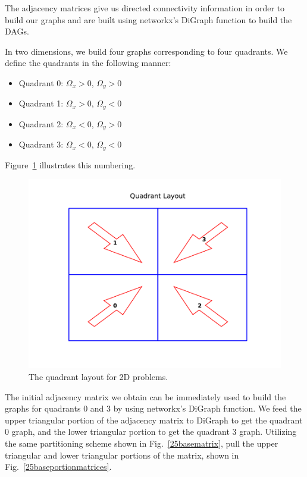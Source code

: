 \documentclass[times,final]{elsarticle}
\begin{document}
The adjacency matrices give us directed connectivity information in order to build our graphs and are built using networkx's DiGraph function to build the DAGs.

In two dimensions, we build four graphs corresponding to four quadrants.
We define the quadrants in the following manner:
\begin{itemize}
  \item Quadrant 0: $\Omega_x > 0$, $\Omega_y > 0$
  \item Quadrant 1: $\Omega_x > 0$, $\Omega_y < 0$
  \item Quadrant 2: $\Omega_x < 0$, $\Omega_y > 0$
  \item Quadrant 3: $\Omega_x < 0$, $\Omega_y < 0$
\end{itemize}
Figure~\ref{quadrant_layout} illustrates this numbering.
\begin{figure}[H]
\centering
\includegraphics{../figures/quadrant_layout.pdf}
\caption{The quadrant layout for 2D problems.}
\label{quadrant_layout}
\end{figure}
The initial adjacency matrix we obtain can be immediately used to build the graphs for quadrants 0 and 3 by using networkx's DiGraph function.
We feed the upper triangular portion of the adjacency matrix to DiGraph to get the quadrant 0 graph, and the lower triangular portion to get the quadrant 3 graph.
Utilizing the same partitioning scheme shown in Fig.~\ref{25basematrix}, pull the upper triangular and lower triangular portions of the matrix, shown in Fig.~\ref{25baseportionmatrices}.
\end{document}
